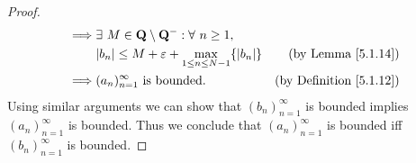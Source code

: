 \begin{proof}
\begin{align*}
        \implies & \exists\ M \in \mathbf{Q} \setminus \mathbf{Q}^- : \forall\ n \geq 1,                                                                                      \\
                 & \abs*{b_n} \leq M + \varepsilon + \max_{1 \leq n \leq N - 1}\{\abs*{b_n}\}                                     & \text{(by Lemma \ref{5.1.14})}            \\
        \implies & (a_n)_{n = 1}^\infty \text{ is bounded}.                                                                       & \text{(by Definition \ref{5.1.12})}
    \end{align*}
    Using similar arguments we can show that \((b_n)_{n = 1}^\infty\) is bounded implies \((a_n)_{n = 1}^\infty\) is bounded.
    Thus we conclude that \((a_n)_{n = 1}^\infty\) is bounded iff \((b_n)_{n = 1}^\infty\) is bounded.
\end{proof}
